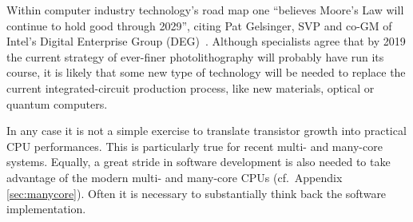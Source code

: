 
Within computer industry technology's road map one ``believes Moore's Law will 
continue to hold good through 2029'',  citing Pat Gelsinger, SVP and co-GM of 
Intel's Digital Enterprise Group (DEG)~\cite{IntelCite}.
Although specialists agree that by 2019 the current strategy of ever-finer 
photolithography will 
probably have run its course, it is likely that some new type of technology 
will be needed to replace the current
integrated-circuit production process, like new materials, optical or quantum 
computers.

In any case it is not a simple exercise to translate transistor growth into 
practical CPU performances. This is
particularly true for recent multi- and many-core systems. Equally, a great
stride in software development is also needed to take advantage of the modern 
multi- and many-core CPUs (cf.\ Appendix \ref{sec:manycore}).
Often it is necessary to substantially think back the software implementation.

